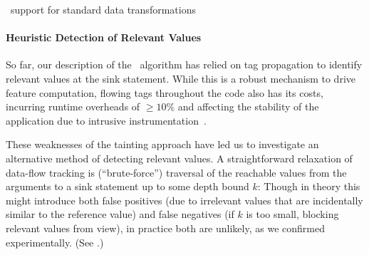 \begin{algorithm}[t]
\begin{small}
\DontPrintSemicolon
{}
\;
\end{small}
\caption{\label{Al:transform}\Tool\ support for standard data transformations}
\end{algorithm}

\paragraph{Heuristic Detection of Relevant Values} So far, our description of the \Tool\ algorithm has relied on tag propagation to identify relevant values at the sink statement. While this is a robust mechanism to drive feature computation, flowing tags throughout the code also has its costs, incurring runtime overheads of $\geq 10\%$ and affecting the stability of the application due to intrusive instrumentation~\cite{EGCCJMS:OSDI10}.

These weaknesses of the tainting approach have led us to investigate an alternative method of detecting relevant values. A straightforward relaxation of data-flow tracking is  (``brute-force'') traversal of the reachable values from the arguments to a sink statement up to some depth bound $k$: 
Though in theory this might introduce both false positives (due to irrelevant values that are incidentally similar to the reference value) and false negatives (if $k$ is too small, blocking relevant values from view), in practice both are unlikely, as we confirmed experimentally. (See .) 

